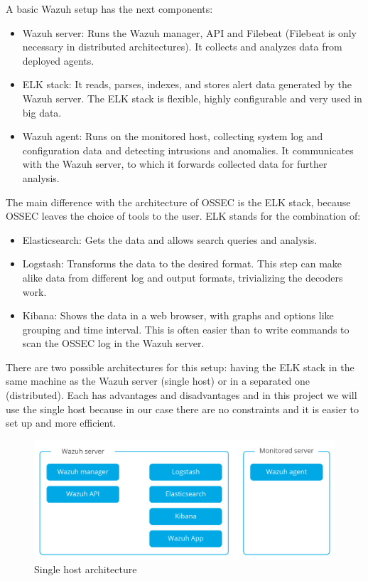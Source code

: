 A basic Wazuh setup has the next components\cite{wazuh_architecture}:
\begin{itemize}
	\item Wazuh server: Runs the Wazuh manager, API and Filebeat (Filebeat is only necessary in distributed architectures). It collects and analyzes data from deployed agents.
	\item ELK stack: It reads, parses, indexes, and stores alert data generated by the Wazuh server. The ELK stack is flexible, highly configurable and very used in big data.
	\item Wazuh agent: Runs on the monitored host, collecting system log and configuration data and detecting intrusions and anomalies. It communicates with the Wazuh server, to which it forwards collected data for further analysis.
\end{itemize}
\linej
The main difference with the architecture of OSSEC is the ELK stack, because OSSEC leaves the choice of tools to the user. ELK stands for the combination of:
\begin{itemize}
	\item Elasticsearch: Gets the data and allows search queries and analysis.
	\item Logstash: Transforms the data to the desired format. This step can make alike data from different log and output formats, trivializing the decoders work.
	\item Kibana: Shows the data in a web browser, with graphs and options like grouping and time interval. This is often easier than to write commands to scan the OSSEC log in the Wazuh server.
\end{itemize}
\linej
\label{singlehost}
There are two possible architectures for this setup: having the ELK stack in the same machine as the Wazuh server (single host) or in a separated one (distributed). Each has advantages and disadvantages and in this project we will use the single host because in our case there are no constraints and it is easier to set up and more efficient.
\begin{figure}[H]
  \centering
	\includegraphics[width=\textwidth]{figuras/wazuh_singlehost.png}
	\caption{Single host architecture}
\end{figure}

